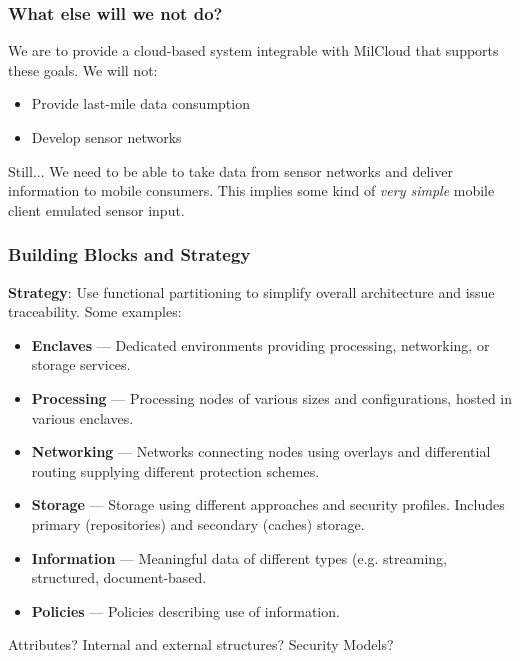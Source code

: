 \documentclass[t,handout]{beamer}
\begin{document}
\begin{frame}
\frametitle{What else will we not do?}
We are to provide a cloud-based system integrable with MilCloud that supports these goals.  We will not:
\begin{itemize}
\item Provide last-mile data consumption
\item Develop sensor networks
\end{itemize}
\begin{beamerboxesrounded}[shadow]{Still...}
{\small We need to be able to take data from sensor networks and deliver information to mobile consumers. This implies some kind of {\sl very simple} mobile client emulated sensor input.}
\end{beamerboxesrounded}
\end{frame}

\begin{frame}
\frametitle{Building Blocks and Strategy}
{\bf Strategy}: Use functional partitioning to simplify overall architecture and issue traceability. Some examples:
\begin{itemize}
\item {\small {\bf Enclaves} --- Dedicated environments providing processing, networking, or storage services.}
\item {\small {\bf Processing} --- Processing nodes of various sizes and configurations, hosted in various enclaves.}
\item {\small {\bf Networking} --- Networks connecting nodes using overlays and differential routing supplying different protection schemes.}
\item {\small {\bf Storage} --- Storage using different approaches and security profiles.  Includes primary (repositories) and secondary (caches) storage.}
\item {\small {\bf Information} --- Meaningful data of different types (e.g. streaming, structured, document-based.}
\item {\small {\bf Policies} --- Policies describing use of information.}
\end{itemize}
Attributes? Internal and external structures? Security Models?
\end{frame}
\end{document}
